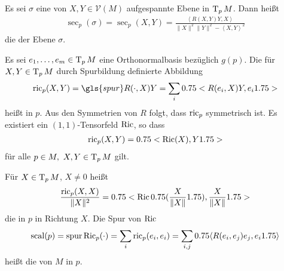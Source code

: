 \begin{Dfn}
Es sei $\sigma$ eine von $X,Y \in \mathcal V(M)$ aufgespannte Ebene in $\operatorname{T}_pM$.
Dann heißt 
\begin{align*}
	\sec_p(\sigma) = \sec_p(X,Y) = \frac{\left<R(X,Y)Y,X\right>}{\|X\|^2\|Y\|^2 - \left<X,Y\right>^2}
\end{align*}
die  der Ebene $\sigma$.
\end{Dfn}



Es sei $e_1, \ldots, e_m \in  \operatorname{T}_pM$ eine Orthonormalbasis bezüglich $g(p)$. Die für $X,Y \in \operatorname{T}_pM$ durch Spurbildung definierte Abbildung
\begin{align*}
  \ric_p(X,Y) = \gls{spur} R(\cdot,X)Y = \sum_i\left<R(e_i,X)Y,e_i\right>
\end{align*}
heißt  in $p$. Aus den Symmetrien von $R$ folgt, dass $\operatorname{ric}_p$ symmetrisch ist.
Es existiert ein $(1,1)$-Tensorfeld $\operatorname{Ric}$, so dass
\begin{align*}
  \operatorname{ric}_p(X,Y) = 0.75<\operatorname{Ric}(X),Y1.75>
\end{align*}
für alle $p \in M, \ X,Y \in \operatorname{T}_pM$ gilt.

\begin{Dfn}
  Für $X \in \operatorname{T}_pM$, $X \neq 0$ heißt
  \begin{align*}
    \frac{\operatorname{ric}_p(X,X)}{\|X\|^2} = 0.75<\operatorname{Ric}0.75(\frac{X}{\|X\|}1.75),\frac{X}{\|X\|}1.75>
  \end{align*}
die  in $p$ in Richtung $X$. Die Spur von $\operatorname{Ric}$
\begin{align*}
  \operatorname{scal}(p) = \operatorname{spur} \operatorname{Ric}_p(\cdot) = \sum_i \operatorname{ric}_p(e_i,e_i) = \sum_{i,j} 0.75\langle R(e_i,e_j)e_j,e_i 1.75\rangle
\end{align*}
heißt die  von $M$ in $p$.
\end{Dfn}



